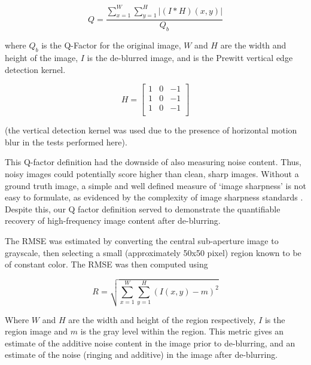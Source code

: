 \begin{equation}
Q = \frac{\sum_{x=1}^{W} \sum_{y=1}^{H}
\left| (I \ast H)(x, y) \right|
\label{eq:q_factor}}{Q_b}
\end{equation}

where $Q_b$ is the Q-Factor for the original image, $W$ and $H$ are the width and height of the image, $I$ is the de-blurred image, and is the Prewitt vertical edge detection kernel.

\begin{equation}
H = 
\begin{bmatrix}
1 & 0 & -1 \\
1 & 0 & -1 \\
1 & 0 & -1 \\
\end{bmatrix}
\label{eq:prewitt_filter}
\end{equation}

(the vertical detection kernel was used due to the presence of horizontal motion blur in the tests performed here).

This Q-factor definition had the downside of also measuring noise content.
Thus, noisy images could potentially score higher than clean, sharp images.
Without a ground truth image, a simple and well defined measure of \enquote*{image sharpness} is not easy to formulate, as evidenced by the complexity of image sharpness standards \cite{imatest2014sharpness}.
Despite this, our Q factor definition served to demonstrate the quantifiable recovery of high-frequency image content after de-blurring.

The RMSE was estimated by converting the central sub-aperture image to grayscale, then selecting a small (approximately 50x50 pixel) region known to be of constant color.
The RMSE was then computed using

\begin{equation}
R = \sqrt{ \sum_{x=1}^{W} \sum_{y=1}^{H} (I(x,y) - m)^2 }
\end{equation}

Where $W$ and $H$ are the width and height of the region respectively, $I$ is the region image and $m$ is the gray level within the region.
This metric gives an estimate of the additive noise content in the image prior to de-blurring, and an estimate of the noise (ringing and additive) in the image after de-blurring.

